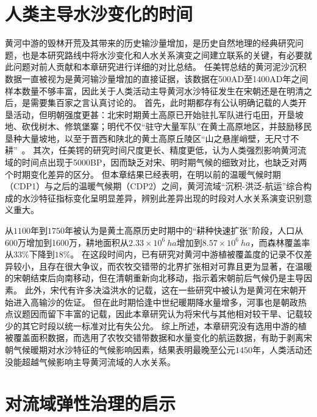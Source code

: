 \section{人类主导水沙变化的时间}

黄河中游的毁林开荒及其带来的历史输沙量增加，是历史自然地理的经典研究问题，也是本研究路线中将水沙变化和人\textendash{}水关系演变之间建立联系的关键，有必要就此问题对前人贡献和本章研究进行详细的对比总结。
任美锷总结的黄河泥沙沉积数据一直被视为是黄河输沙量增加的直接证据\cite{renmeie2006}，该数据在500AD至1400AD年之间样本数量不够丰富，因此关于人类活动主导黄河水沙特征发生在宋朝还是在明清之后，是需要集百家之言认真讨论的。
首先，此时期都存有公认明确记载的人类开垦活动，但明朝强度更甚：北宋时期黄土高原已开始驻扎军队进行屯田，开垦坡地、砍伐树木、修筑堡寨；明代不仅“驻守大量军队”在黄土高原地区，并鼓励移民垦种大量坡地，以至于晋西和陕北的黄土高原丘陵区“山之悬崖峭壁，无尺寸不耕”~\cite{renmeie2006,wu2020a,shinianhai1985}。
其次，任美锷的研究时间尺度更长、精度更低，认为人类强烈影响黄河流域的时间点出现于5000BP，因而缺乏对宋、明时期气候的细致对比，也缺乏对两个时期变化差异的区分\cite{renmeie2006, mei-e1994}。
但本章结果已经表明，在明以前的温暖气候时期（CDP1）与之后的温暖气候期（CDP2）之间，黄河流域“沉积-洪泛-航运”综合构成的水沙特征指标变化呈明显差异，辨别此差异出现的时段对人\textendash{}水关系演变识别意义重大。

从$1100$年到$1750$年被认为是黄土高原历史时期中的“耕种快速扩张”阶段，人口从600万增加到1600万，耕地面积从$2.33 \times 10^6~ha$增加到$8.57 \times 10^6~ha$，而森林覆盖率从$33\%$下降到$18\%$\cite{wu2020a}。
在这段时间内，已有研究对黄河中游植被覆盖度的记录不仅差异较小，且存在很大争议，而农牧交错带的北界扩张相对可靠且更为显著，在温暖的宋朝结束后向南移动，但在清朝重新向北移动，指示着宋朝前后气候仍是主导因素\cite{shinianhai1985,GeQuanSheng2011}。
此外，宋代有许多决溢洪水的记载，这在一些研究中被认为是黄河在宋朝开始进入高输沙的佐证\cite{chen2012}。
但在此时期恰逢中世纪暖期降水量增多，河事也是朝政热点议题因而留下丰富的记载，因此本章研究认为将宋代与其他相对较干旱、记载较少的其它时段以统一标准对比有失公允。
综上所述，本章研究没有选用中游的植被覆盖面积数据，而选用了农牧交错带数据和水量变化的航运数据，有助于剥离宋朝气候暖期对水沙特征的气候影响因素，结果表明最晚至公元$1450$年，人类活动还没能超越气候影响主导黄河流域的人\textendash{}水关系。


\section{对流域弹性治理的启示}

